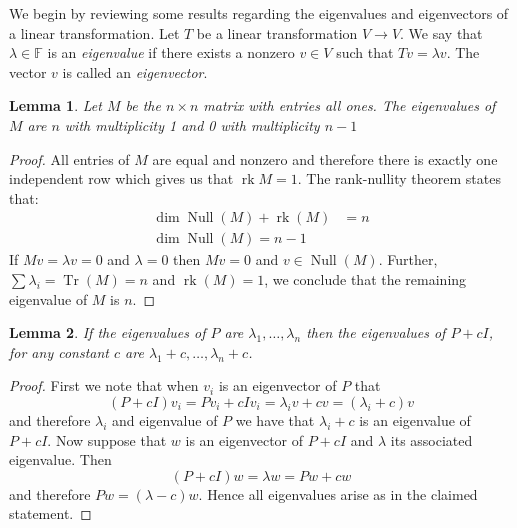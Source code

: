 \documentclass[10pt, letterpaper]{article}
\newcommand{\field}[1]{\mathbb{#1}}
\newtheorem{lemma}{Lemma}
\theoremstyle{remark}
\theoremstyle{definition}
\begin{document}
    We begin by reviewing some results regarding the eigenvalues and eigenvectors of a linear transformation.
    Let $T$ be a linear transformation $V \rightarrow V$. We say that $\lambda \in \field{F}$ is an \textit{eigenvalue}
    if there exists a nonzero $v \in V$ such that $Tv = \lambda v$. The vector $v$ is called an \textit{eigenvector}.

    \begin{lemma}
        Let $M$ be the $n \times n$ matrix with entries all ones. The eigenvalues of $M$ are $n$ with multiplicity 1 and
        0 with multiplicity $n-1$
    \end{lemma}

    \begin{proof}
        All entries of $M$ are equal and nonzero and therefore there is exactly one independent row which gives us that
        $\operatorname{rk} M = 1$. The rank-nullity theorem states that:
        \begin{align*}
            \dim \operatorname{Null}(M) + \operatorname{rk} (M) &= n \\
            \dim \operatorname{Null}(M) = n-1
        \end{align*}
        If $Mv = \lambda v = 0$ and $\lambda = 0$ then $Mv = 0$ and $v \in \operatorname{Null}(M)$. Further,
        $\sum \lambda_i = \operatorname{Tr}(M) = n$ and $\operatorname{rk} (M) = 1$, we conclude that the remaining
        eigenvalue of $M$ is $n$.
    \end{proof}

    \begin{lemma}
        If the eigenvalues of $P$ are $\lambda_1, \ldots , \lambda_n$ then the eigenvalues of $P+cI$, for any constant $c$
        are $\lambda_1 + c, \ldots, \lambda_n + c$.
    \end{lemma}

    \begin{proof}
        First we note that when $v_i$ is an eigenvector of $P$ that
        \[
            (P+cI) v_i = Pv_i + cIv_i = \lambda_i v + c v = (\lambda_i + c)v
        \]
        and therefore $\lambda_i$ and eigenvalue of $P$ we have that $\lambda_i + c$ is an eigenvalue of $P+cI$. Now suppose
        that $w$ is an eigenvector of $P+cI$ and $\lambda$ its associated eigenvalue. Then
        \[
            (P+cI)w = \lambda w = Pw + cw
        \]
        and therefore $Pw = (\lambda - c)w$. Hence all eigenvalues arise as in the claimed statement.
    \end{proof}
\end{document}
